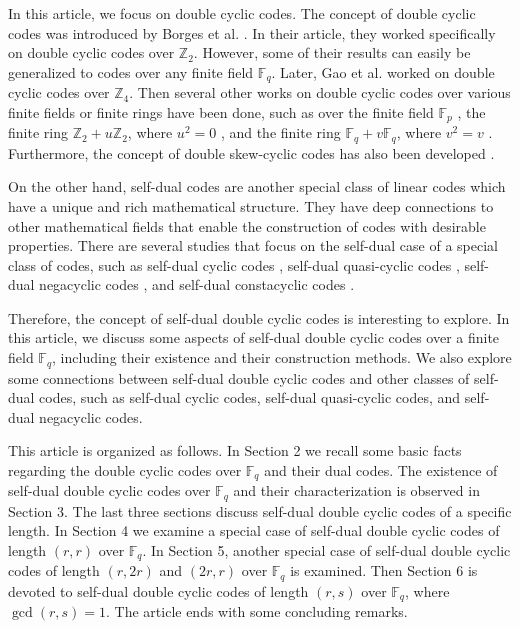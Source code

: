 \documentclass[12pt]{article}
\begin{document}
	In this article, we focus on double cyclic codes. The concept of double cyclic codes was introduced by Borges et al. \cite{Borges2018}. In their article, they worked specifically on double cyclic codes over $\mathbb{Z}_2$. However, some of their results can easily be generalized to codes over any finite field $\mathbb{F}_q$. Later, Gao et al. \cite{Gao2016} worked on double cyclic codes over $\mathbb{Z}_4.$  Then several other works on double cyclic codes over various finite fields or finite rings have been done, such as over the finite field $\mathbb{F}_p$ \cite{Abualrub2024}, the finite ring $\mathbb{Z}_2+u\mathbb{Z}_2$, where $u^2=0$ \cite{Aydogdu2024}, and the finite ring $\mathbb{F}_q+v\mathbb{F}_q$, where $v^2=v$ \cite{Deng2020}. Furthermore, the concept of double skew-cyclic codes has also been developed \cite{Aydogdu2022}.
	
	On the other hand, self-dual codes are another special class of linear codes which have a unique and rich mathematical structure. They have deep connections to other mathematical fields that enable the construction of codes with desirable properties. There are several studies that focus on the self-dual case of a special class of codes, such as self-dual cyclic codes \cite{Jia2011,Zhang2024}, self-dual quasi-cyclic codes \cite{Ling2001,Choi2024}, self-dual negacyclic codes \cite{Guenda2012,Jitman2020}, and self-dual constacyclic codes \cite{Yang2015}.
	
	Therefore, the concept of self-dual double cyclic codes is interesting to explore. In this article, we discuss some aspects of self-dual double cyclic codes over a finite field $\mathbb{F}_q$, including their existence and their construction methods. We also explore some connections between self-dual double cyclic codes and other classes of self-dual codes, such as self-dual cyclic codes, self-dual quasi-cyclic codes, and self-dual negacyclic codes.
	
	This article is organized as follows. In Section 2 we recall some basic facts regarding the double cyclic codes over $\mathbb{F}_q$ and their dual codes. %
	The existence of self-dual double cyclic codes over $\mathbb{F}_q$ and their characterization is observed in Section 3. The %
	last three sections discuss self-dual double cyclic codes of a specific length. In Section 4 we examine a special case of self-dual double cyclic codes of length $(r,r)$ over $\mathbb{F}_q$. In Section 5, another special case of self-dual double cyclic codes of length $(r,2r)$ and $(2r,r)$ over $\mathbb{F}_q$ is examined. Then Section 6 is devoted to %
	self-dual double cyclic codes of length $(r,s)$ over $\mathbb{F}_q$, where $\gcd(r,s)=1$. The article ends with some concluding remarks.
	
\end{document}
